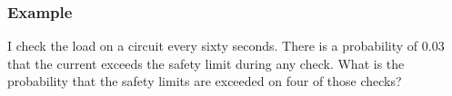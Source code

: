 \begin{frame}
  \frametitle{Example}

  I check the load on a circuit every sixty seconds. There is a
  probability of 0.03 that the current exceeds the safety limit during
  any check. What is the probability that the safety limits are
  exceeded on four of those checks?

  \vfill

\end{frame}



